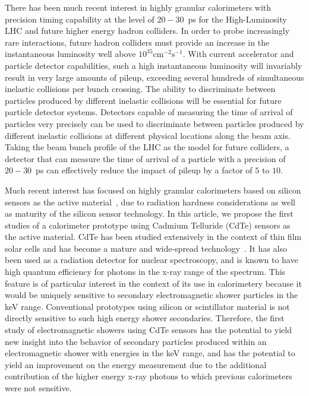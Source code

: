 \documentclass[preprint,1p]{elsarticle}
\begin{document}
There has been much recent interest in highly granular calorimeters with 
precision timing capability at the level of $20-30$~ps for the High-Luminosity
LHC and future higher energy hadron colliders. In order to probe increasingly
rare interactions, future hadron colliders must provide an increase in the
instantaneous luminosity well above $10^{35}\mathrm{cm}^{-2}\mathrm{s}^{-1}$.
With current accelerator and particle detector capabilities, such a high 
instantaneous luminosity will invariably result in very large amounts
of pileup, exceeding several hundreds of simultaneous inelastic collisions per
bunch crossing. The ability to discriminate between particles produced by 
different inelastic collisions will be essential for future particle detector
systems. Detectors capable of measuring the time of arrival of particles
very precisely can be used to discriminate between particles produced by
different inelastic collisions at different physical locations along the beam
axis. Taking the beam bunch profile of the LHC as the model for future
colliders, a detector that can measure the time of arrival of a particle
with a precision of $20-30$~ps can effectively reduce the impact of
pileup by a factor of $5$ to $10$. 

Much recent interest has focused on highly granular calorimeters based on 
silicon sensors as the active material~\cite{CALICE,HGCal}, due to
radiation hardness considerations as well as maturity of the silicon sensor
technology. In this article, we propose the first studies of a 
calorimeter prototype using Cadmium Telluride (CdTe) sensors as the 
active material. CdTe has been studied extensively in the context
of thin film solar cells and has become a mature and wide-spread
technology~\cite{CdTeSolar}. It has also been used as a radiation
detector for nuclear spectroscopy, and is known to have high
quantum efficiency for photons in the x-ray range of the spectrum.
This feature is of particular interest in the context of its use
in calorimetery because it would be uniquely sensitive to secondary
electromagnetic shower particles in the keV range. Conventional prototypes 
using silicon or scintillator material is not directly sensitive to such high 
energy shower secondaries. Therefore, the first study of electromagnetic
showers using CdTe sensors has the potential to yield new insight
into the behavior of secondary particles produced within an 
electromagnetic shower with energies in the keV range, and has the potential
to yield an improvement on the energy measurement due to
the additional contribution of the higher energy x-ray photons to which previous
calorimeters were not sensitive.
\end{document}

